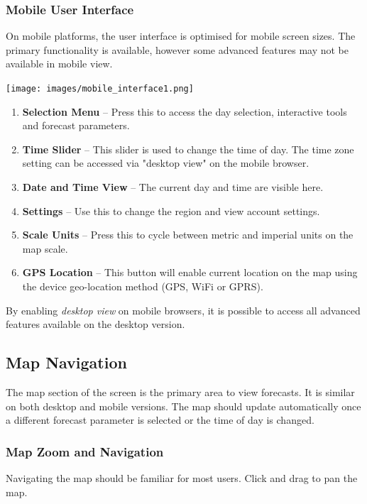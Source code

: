 \documentclass[11pt,a4paper]{article}
\begin{document}
\subsubsection{Mobile User Interface}
On mobile platforms, the user interface is optimised for mobile screen sizes. The primary functionality is available, however some advanced features may not be available in mobile view.
\begin{center}
\texttt{[image: images/mobile\_interface1.png]}
\end{center}
\begin{enumerate}
\item \textbf{Selection Menu} -- Press this to access the day selection, interactive tools and forecast parameters.
\item \textbf{Time Slider} -- This slider is used to change the time of day. The time zone setting can be accessed via "desktop view" on the mobile browser.
\item \textbf{Date and Time View} -- The current day and time are visible here.
\item \textbf{Settings} -- Use this to change the region and view account settings.
\item \textbf{Scale Units} -- Press this to cycle between metric and imperial units on the map scale.
\item \textbf{GPS Location} -- This button will enable current location on the map using the device geo-location method (GPS, WiFi or GPRS).
\end{enumerate}

\begin{tip}
\item By enabling \emph{desktop view} on mobile browsers, it is possible to access all advanced features available on the desktop version.
\end{tip}
\subsection{Map Navigation}\label{subsec:mapnav}
The map section of the screen is the primary area to view forecasts. It is similar on both desktop and mobile versions. The map should update automatically once a different forecast parameter is selected or the time of day is changed.

\subsubsection{Map Zoom and Navigation}
Navigating the map should be familiar for most users. Click and drag to pan the map. 
\end{document}
